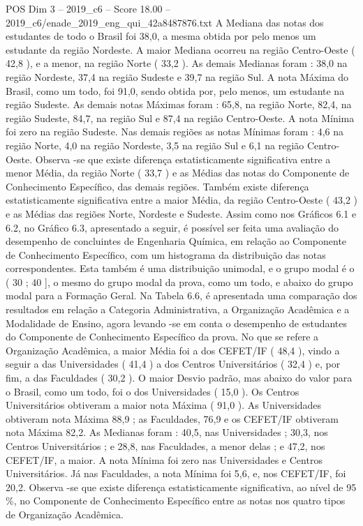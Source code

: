 \begin{textsample}{POS Dim 3 – 2019\_c6 – Score 18.00 – 2019\_c6/enade\_2019\_eng\_qui\_42a8487876.txt}
A Mediana das notas dos estudantes de todo o Brasil foi 38,0, a mesma obtida por pelo menos um estudante da região Nordeste.
A maior Mediana ocorreu na região Centro-Oeste ( 42,8 ), e a menor, na região Norte ( 33,2 ).
As demais Medianas foram : 38,0 na região Nordeste, 37,4 na região Sudeste e 39,7 na região Sul.
A nota Máxima do Brasil, como um todo, foi 91,0, sendo obtida por, pelo menos, um estudante na região Sudeste.
As demais notas Máximas foram : 65,8, na região Norte, 82,4, na região Sudeste, 84,7, na região Sul e 87,4 na região Centro-Oeste.
A nota Mínima foi zero na região Sudeste.
Nas demais regiões as notas Mínimas foram : 4,6 na região Norte, 4,0 na região Nordeste, 3,5 na região Sul e 6,1 na região Centro-Oeste.
Observa -se que existe diferença estatisticamente significativa entre a menor Média, da região Norte ( 33,7 ) e as Médias das notas do Componente de Conhecimento Específico, das demais regiões.
Também existe diferença estatisticamente significativa entre a maior Média, da região Centro-Oeste ( 43,2 ) e as Médias das regiões Norte, Nordeste e Sudeste.
Assim como nos Gráficos 6.1 e 6.2, no Gráfico 6.3, apresentado a seguir, é possível ser feita uma avaliação do desempenho de concluintes de Engenharia Química, em relação ao Componente de Conhecimento Específico, com um histograma da distribuição das notas correspondentes.
Esta também é uma distribuição unimodal, e o grupo modal é o ( 30 ; 40 ], o mesmo do grupo modal da prova, como um todo, e abaixo do grupo modal para a Formação Geral.
Na Tabela 6.6, é apresentada uma comparação dos resultados em relação a Categoria Administrativa, a Organização Acadêmica e a Modalidade de Ensino, agora levando -se em conta o desempenho de estudantes do Componente de Conhecimento Específico da prova.
No que se refere a Organização Acadêmica, a maior Média foi a dos CEFET/IF ( 48,4 ), vindo a seguir a das Universidades ( 41,4 ) a dos Centros Universitários ( 32,4 ) e, por fim, a das Faculdades ( 30,2 ).
O maior Desvio padrão, mas abaixo do valor para o Brasil, como um todo, foi o dos Universidades ( 15,0 ).
Os Centros Universitários obtiveram a maior nota Máxima ( 91,0 ).
As Universidades obtiveram nota Máxima 88,9 ; as Faculdades, 76,9 e os CEFET/IF obtiveram nota Máxima 82,2.
As Medianas foram : 40,5, nas Universidades ; 30,3, nos Centros Universitários ; e 28,8, nas Faculdades, a menor delas ; e 47,2, nos CEFET/IF, a maior.
A nota Mínima foi zero nas Universidades e Centros Universitários.
Já nas Faculdades, a nota Mínima foi 5,6, e, nos CEFET/IF, foi 20,2.
Observa -se que existe diferença estatisticamente significativa, ao nível de 95 \%, no Componente de Conhecimento Específico entre as notas nos quatro tipos de Organização Acadêmica.

\end{textsample}
